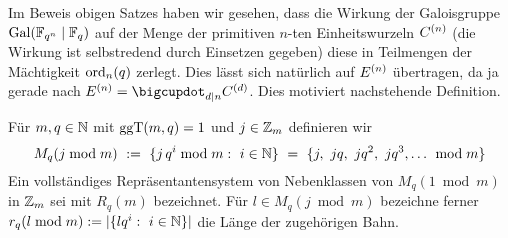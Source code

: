 \begin{lemma}
  \label{lemma:kreisteilungspolynome_in_binome}

\end{lemma}


Im Beweis obigen Satzes haben wir gesehen, dass die Wirkung der Galoisgruppe
$\operatorname{Gal}(\mathbb{F}_{q^n}\mid \mathbb{F}_q)$ auf der Menge der primitiven $n$-ten Einheitswurzeln
$C^{(n)}$ (die Wirkung ist selbstredend durch Einsetzen gegeben) diese in 
Teilmengen der Mächtigkeit $\operatorname{ord}_n(q)$ zerlegt.
Dies lässt sich natürlich auf $E^{(n)}$ übertragen, da ja gerade 
nach 
$E\kl n = \bigcupdot_{d\mid n} C\kl d$. 
Dies motiviert nachstehende Definition.


  


\begin{definition}
  \label{def:nebenklassen_mod_m}
  Für $m,q\in\mathbb{N}$ mit $\operatorname{ggT}(m,q) = 1$ und $j \in \mathbb{Z}_m$ definieren wir
  \[ M_q(j\bmod m) \speq{:=} \{ j\,q^i \bmod m:\ i\in\N\} \speq= 
    \{j,\ jq,\ jq^2,\ jq^3,\ldots\ \bmod m\}\]
  Ein vollständiges Repräsentantensystem von Nebenklassen von $M_q(1\bmod m)$
  in $\mathbb{Z}_m$ sei mit $R_q(m)$ bezeichnet. Für $l \in M_q(j\bmod m)$ 
  bezeichne ferner
  $r_q(l \bmod m) := |\{lq^i:\ i\in \N \}|$ die Länge der zugehörigen Bahn.
\end{definition}

